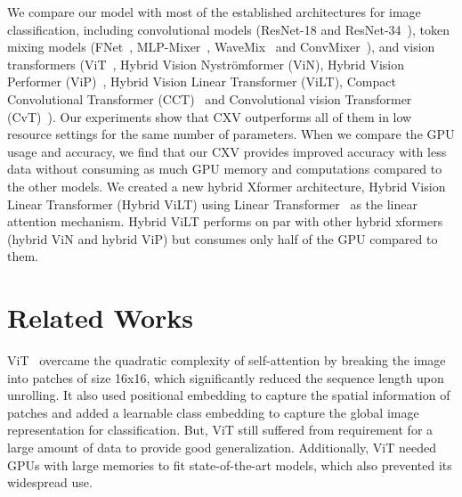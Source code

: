 \documentclass{article}
\begin{document}
We compare our model with most of the established architectures for image classification, including convolutional models (ResNet-18 and ResNet-34~\cite{he2015deep}), token mixing models  (FNet~\cite{leethorp2021fnet}, MLP-Mixer~\cite{tolstikhin2021mlpmixer}, WaveMix~\cite{p2022wavemix} and ConvMixer~\cite{anonymous2022patches}), and vision transformers (ViT~\cite{dosovitskiy2021image}, Hybrid Vision Nyströmformer (ViN), Hybrid Vision Performer (ViP)~\cite{jeevan2021vision}, Hybrid Vision Linear Transformer (ViLT), Compact Convolutional Transformer (CCT)~\cite{hassani2021escaping} and Convolutional vision Transformer (CvT)~\cite{wu2021cvt}). Our experiments show that CXV outperforms all of them in low resource settings for the same number of parameters. When we compare the GPU usage and accuracy, we find that our CXV provides improved accuracy with less data without consuming as much GPU memory and computations compared to the other models.  We created a new hybrid Xformer architecture, Hybrid Vision Linear Transformer (Hybrid ViLT) using Linear Transformer~\cite{katharopoulos2020transformers} as the linear attention mechanism. Hybrid ViLT performs on par with other hybrid xformers (hybrid ViN and hybrid ViP) but consumes only half of the GPU compared to them.


\section{Related Works}

ViT~\cite{dosovitskiy2021image} overcame the quadratic complexity of self-attention by breaking the image into patches of size 16x16, which significantly reduced the sequence length upon unrolling. It also used positional embedding to capture the spatial  information of patches and added a learnable class embedding to capture the global image representation for classification. But, ViT still suffered from requirement for a large amount of data to provide good generalization. Additionally, ViT needed GPUs with large memories to fit state-of-the-art models, which also prevented its widespread use. 
\end{document}
